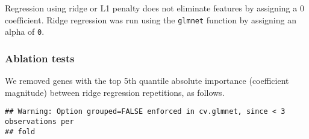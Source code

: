 \documentclass[]{article}
\newenvironment{Shaded}{\begin{snugshade}}{\end{snugshade}}
\newcommand{\ControlFlowTok}[1]{\textcolor[rgb]{0.13,0.29,0.53}{\textbf{#1}}}
\newcommand{\DataTypeTok}[1]{\textcolor[rgb]{0.13,0.29,0.53}{#1}}
\newcommand{\DecValTok}[1]{\textcolor[rgb]{0.00,0.00,0.81}{#1}}
\newcommand{\FloatTok}[1]{\textcolor[rgb]{0.00,0.00,0.81}{#1}}
\newcommand{\KeywordTok}[1]{\textcolor[rgb]{0.13,0.29,0.53}{\textbf{#1}}}
\newcommand{\NormalTok}[1]{#1}
\newcommand{\OperatorTok}[1]{\textcolor[rgb]{0.81,0.36,0.00}{\textbf{#1}}}
\newcommand{\StringTok}[1]{\textcolor[rgb]{0.31,0.60,0.02}{#1}}
\begin{document}
Regression using ridge or L1 penalty does not eliminate features by
assigning a 0 coefficient. Ridge regression was run using the
\texttt{glmnet} function by assigning an alpha of \texttt{0}.

\hypertarget{ablation-tests-2}{%
\subsubsection{Ablation tests}\label{ablation-tests-2}}

We removed genes with the top 5th quantile absolute importance
(coefficient magnitude) between ridge regression repetitions, as
follows.

\begin{Shaded}
\end{Shaded}

\begin{verbatim}
## Warning: Option grouped=FALSE enforced in cv.glmnet, since < 3 observations per
## fold
\end{verbatim}
\end{document}
